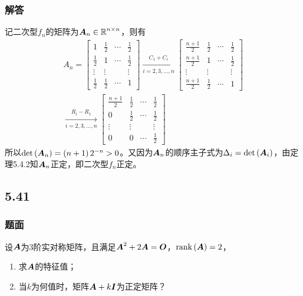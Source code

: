 \documentclass{beamer}
\begin{document}
\begin{frame}
    \frametitle{解答}
    记二次型\(f_n\)的矩阵为\(\boldsymbol{A}_n\in\boldsymbol{\mathbb{R}}^{n\times n}\)，则有
    \begin{gather*}
        A_n =
        \begin{bmatrix}
            1           & \frac{1}{2} & \cdots & \frac{1}{2} \\
            \frac{1}{2} & 1           & \cdots & \frac{1}{2} \\
            \vdots      & \vdots      &        & \vdots      \\
            \frac{1}{2} & \frac{1}{2} & \cdots & 1
        \end{bmatrix}\xrightarrow[i=2,3,\dots,n]{C_1+C_i}
        \begin{bmatrix}
            \frac{n+1}{2} & \frac{1}{2} & \cdots & \frac{1}{2} \\
            \frac{n+1}{2} & 1           & \cdots & \frac{1}{2} \\
            \vdots        & \vdots      &        & \vdots      \\
            \frac{n+1}{2} & \frac{1}{2} & \cdots & 1
        \end{bmatrix} \\
        \xrightarrow[i=2,3,\dots,n]{R_i-R_1}
        \begin{bmatrix}
            \frac{n+1}{2} & \frac{1}{2} & \cdots & \frac{1}{2} \\
            0             & \frac{1}{2} & \cdots & \frac{1}{2} \\
            \vdots        & \vdots      &        & \vdots      \\
            0             & 0           & \cdots & \frac{1}{2}
        \end{bmatrix}
    \end{gather*}
    \pause
    所以\(\mathrm{det}\left( \boldsymbol{A}_n \right)=\left( n+1 \right)2^{-n}>0\)。又因为\(\boldsymbol{A}_n\)的顺序主子式为\(\Delta_i=\mathrm{det}\left( \boldsymbol{A}_i \right)\)，由定理5.4.2知\(\boldsymbol{A}_n\)正定，即二次型\(f_n\)正定。
\end{frame}

\subsection*{5.41}
\begin{frame}
    \frametitle{题面}
    设\(\boldsymbol{A}\)为\(3\)阶实对称矩阵，且满足\(\boldsymbol{A}^2+2\boldsymbol{A}=\boldsymbol{O}\)，\(\mathrm{rank}\left( \boldsymbol{A} \right)=2\)，
    \begin{enumerate}
        \item 求\(\boldsymbol{A}\)的特征值；
        \item 当\(k\)为何值时，矩阵\(\boldsymbol{A}+k\boldsymbol{I}\)为正定矩阵？
    \end{enumerate}
\end{frame}
\end{document}
